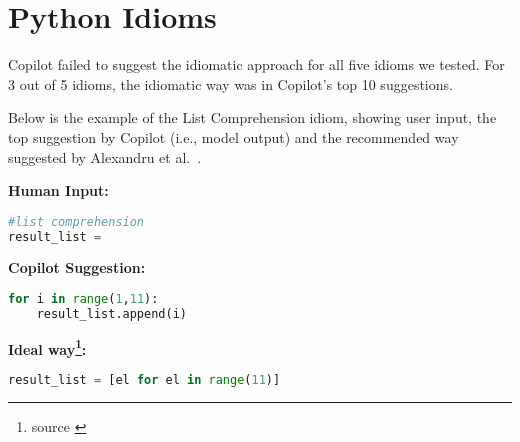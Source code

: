 \section{Python Idioms}
Copilot failed to suggest the idiomatic approach for all five idioms we tested. 
For 3 out of 5 idioms, the idiomatic way was in Copilot's top 10 suggestions.

Below is the example of the List Comprehension idiom, showing user input, the top suggestion by Copilot (i.e., model output) and the recommended way suggested by Alexandru et al.~\cite{Alexandru2018}.

\begin{tcolorbox}[title=List Comprehension,boxsep=.5mm]
\textbf{Human Input:}
\begin{lstlisting}[language={Python}]
#list comprehension
result_list = 
\end{lstlisting}
\tcbline
\textbf{Copilot Suggestion:}
\begin{lstlisting}[language=Python,escapechar=\%]
% \noindent\textcolor{gray}{result\_list  =} % []
for i in range(1,11):
    result_list.append(i)
\end{lstlisting}
\tcbline
\textbf{Ideal way\footnote{source \cite{Alexandru2018}}:}
\begin{lstlisting}[language=Python]
result_list = [el for el in range(11)]
\end{lstlisting}
\end{tcolorbox}
